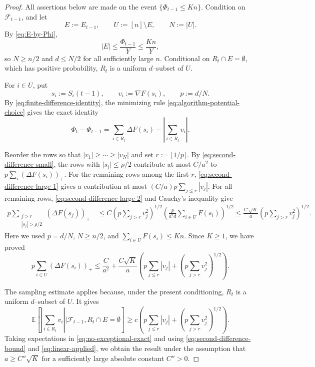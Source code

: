 \documentclass[reqno,english]{amsart}
\newcommand*{\EE}{\mathbb E}
\newcommand*{\calF}{\mathcal F}
\theoremstyle{definition}
\begin{document}
\begin{proof}
All assertions below are made on the event $\{\Phi_{t-1}\le Kn\}$.
Condition on $\calF_{t-1}$, and let
\[
 E:=E_{t-1},\qquad U:=[n]\setminus E,\qquad N:=|U|.
\]
By \eqref{eq:E-by-Phi},
\[
 |E|\le\frac{\Phi_{t-1}}Y\le\frac{Kn}{Y},
\]
{
so $N\ge n/2$ and $d\le N/2$ for all sufficiently large $n$.
Conditional on $R_t\cap E=\emptyset$, which has positive probability,
$R_t$ is a uniform $d$--subset of $U$.
}

For $i\in U$, put
\[
    s_i:=S_i(t-1),\qquad v_i:=\nabla F(s_i),
    \qquad p:=d/N.
\]
By \eqref{eq:finite-difference-identity}, the minimizing rule
\eqref{eq:algorithm-potential-choice} gives the exact identity
\begin{equation}\label{eq:no-exceptional-exact}
    \Phi_t-\Phi_{t-1}
    =\sum_{i\in R_t}\Delta F(s_i)
      -\left|\sum_{i\in R_t}v_i\right|.
\end{equation}

Reorder the rows so that $|v_1|\ge\cdots\ge|v_N|$ and set
$r:=\lfloor1/p\rfloor$. By \eqref{eq:second-difference-small},
the rows with $|s_i|\le\rho/2$ contribute at most
$C/a^2$ to $p\sum_i(\Delta F(s_i))_+$.  For the remaining rows among the
first $r$, \eqref{eq:second-difference-large-1} gives a contribution at most
$(C/a)p\sum_{j\le r}|v_j|$.  For all remaining rows,
\eqref{eq:second-difference-large-2} and Cauchy's inequality give
\begin{align*}
 p\sum_{\substack{j>r\\ |s_j|>\rho/2}}
   (\Delta F(s_j))_+
 \quad\le C
  \left(p\sum_{j>r}v_j^2\right)^{1/2}
  \left(\frac{p}{a^2d}\sum_{i\in U}F(s_i)\right)^{1/2}
 \le\frac{C'\sqrt K}{a}
  \left(p\sum_{j>r}v_j^2\right)^{1/2}.
\end{align*}
Here we used $p=d/N$, $N\ge n/2$, and
$\sum_{i\in U}F(s_i)\le Kn$.  Since $K\ge1$, we have proved
\begin{equation}\label{eq:second-difference-bound}
 p\sum_{i\in U}(\Delta F(s_i))_+
 \le\frac{C}{a^2}+\frac{C\sqrt K}{a}
 \left(
   p\sum_{j\le r}|v_j|
   +\left(p\sum_{j>r}v_j^2\right)^{1/2}
 \right).
\end{equation}

The sampling estimate applies because, under the present conditioning,
$R_t$ is a uniform $d$--subset of $U$.  It gives
\begin{equation}\label{eq:linear-applied}
 \EE\left[\left|\sum_{i\in R_t}v_i\right|
   \mathrel{\Big|}\calF_{t-1},R_t\cap E=\emptyset\right]
 \ge c\left(
   p\sum_{j\le r}|v_j|
   +\left(p\sum_{j>r}v_j^2\right)^{1/2}
 \right).
\end{equation}
Taking expectations in \eqref{eq:no-exceptional-exact} and using
\eqref{eq:second-difference-bound} and \eqref{eq:linear-applied}, we obtain
the result under the assumption that
$a\ge C''\sqrt K$ for a sufficiently large absolute constant $C''>0$.
\end{proof}
\end{document}
